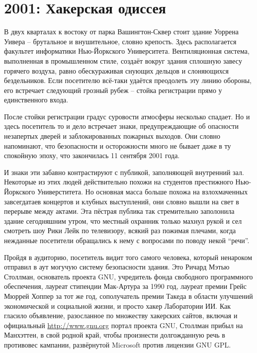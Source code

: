 
\chapter{2001: Хакерская одиссея}

В двух кварталах к востоку от парка Вашингтон-Сквер стоит здание Уоррена Уивера -- брутальное и внушительное, словно крепость. Здесь располагается факультет информатики Нью-Йоркского Университета. Вентиляционная система, выполненная в промышленном стиле, создаёт вокруг здания сплошную завесу горячего воздуха, равно обескураживая снующих дельцов и слоняющихся бездельников. Если посетителю всё-таки удаётся преодолеть эту линию обороны, его встречает следующий грозный рубеж -- стойка регистрации прямо у единственного входа.

После стойки регистрации градус суровости атмосферы несколько спадает. Но и здесь посетитель то и дело встречает знаки, предупреждающие об опасности незапертых дверей и заблокированных пожарных выходов. Они словно напоминают, что безопасности и осторожности много не бывает даже в ту спокойную эпоху, что закончилась 11 сентября 2001 года.

И знаки эти забавно контрастируют с публикой, заполняющей внутренний зал. Некоторые из этих людей действительно похожи на студентов престижного Нью-Йоркского Универститета. Но основная масса больше похожа на взлохмаченных завсегдатаев концертов и клубных выступлений, они словно вышли на свет в перерыве между актами. Эта пёстрая публика так стремительно заполонила здание сегодняшним утром, что местный охранник только махнул рукой и сел смотреть шоу Рики Лейк по телевизору, всякий раз пожимая плечами, когда нежданные посетители обращались к нему с вопросами по поводу некой ``речи''.

Пройдя в аудиторию, посетитель видит того самого человека, который ненароком отправил в аут могучую систему безопасности здания. Это Ричард Мэтью Столлман, основатель проекта GNU, учредитель фонда свободного программного обеспечения, лауреат стипендии Мак-Артура за 1990 год, лауреат премии Грейс Мюррей Хоппер за тот же год, сополучатель премии Такеда в области улучшений экономической и социальной жизни, и просто хакер Лаборатории ИИ. Как гласило объявление, разосланное по множеству хакерских сайтов, включая и официальный \url{http://www.gnu.org} портал проекта GNU, Столлман прибыл на Манхэттен, в свой родной край, чтобы произнести долгожданную речь в противовес кампании, развёрнутой Microsoft против лицензии GNU GPL.

